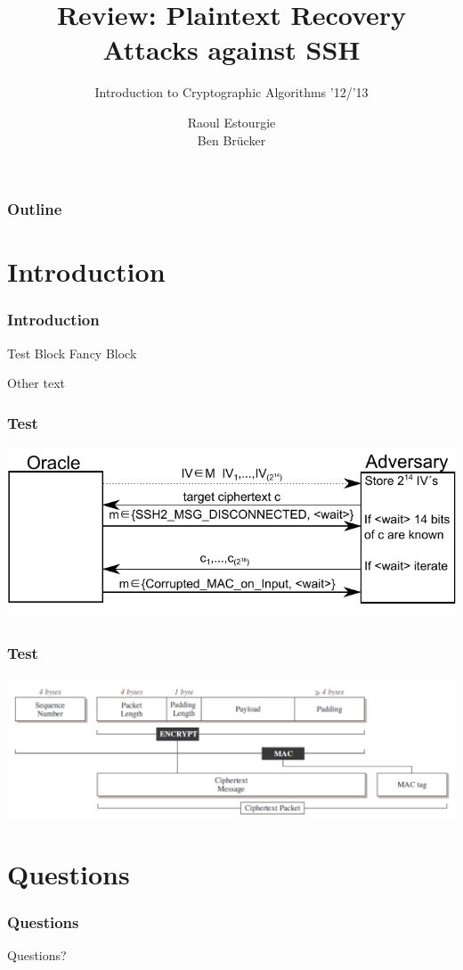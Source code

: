 \documentclass[fleqn]{beamer}
\title[Plaintext Recovery Attacks against SSH]{
Review: Plaintext Recovery Attacks against SSH}
\subtitle{Introduction to Cryptographic Algorithms '12/'13}
\author[Estourgie \& Br\"ucker]{
Raoul Estourgie\\
Ben Br\"ucker}
\institute[Radboud University Nijmegen]{
  Institute for Computing and Information Sciences \\
  Radboud University Nijmegen}
\date[Presentation 5-4-2013]
\begin{document}
  \begin{frame}
    \titlepage
  \end{frame}

  \begin{frame}
    \frametitle{Outline}
    \tableofcontents
  \end{frame}
  
\section{Introduction}

  \begin{frame}
    \frametitle{Introduction}
	\begin{block}{Test Block}
	Fancy Block
	\end{block}
	Other text
  \end{frame}

  \begin{frame}
    \frametitle{Test}
    \begin{center}
    \includegraphics[scale=1]{drawing.pdf}
    \end{center}
  \end{frame}
  
    \begin{frame}
    \frametitle{Test}
    \begin{center}
    \includegraphics[scale=1]{SSHBPP.pdf}
    \end{center}
  \end{frame}
  
\section{Questions}

  \begin{frame}
    \frametitle{Questions}
    \begin{center}
    Questions?
    \end{center}
  \end{frame}
\end{document}
